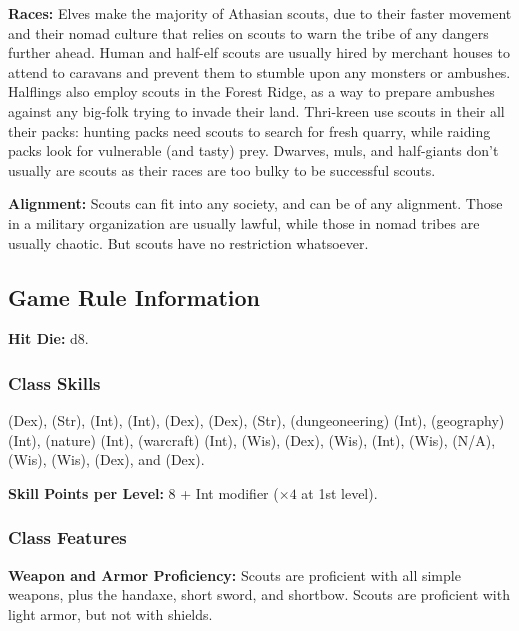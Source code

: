 \textbf{Races:} Elves make the majority of Athasian scouts, due to their faster movement and their nomad culture that relies on scouts to warn the tribe of any dangers further ahead. Human and half-elf scouts are usually hired by merchant houses to attend to caravans and prevent them to stumble upon any monsters or ambushes. Halflings also employ scouts in the Forest Ridge, as a way to prepare ambushes against any big-folk trying to invade their land. Thri-kreen use scouts in their all their packs: hunting packs need scouts to search for fresh quarry, while raiding packs look for vulnerable (and tasty) prey. Dwarves, muls, and half-giants don't usually are scouts as their races are too bulky to be successful scouts.

\textbf{Alignment:} Scouts can fit into any society, and can be of any alignment. Those in a military organization are usually lawful, while those in nomad tribes are usually chaotic. But scouts have no restriction whatsoever.

\subsection{Game Rule Information}
\textbf{Hit Die:} d8.

\subsubsection{Class Skills}
 (Dex),
 (Str),
 (Int),
 (Int),
 (Dex),
 (Dex),
 (Str),
 (dungeoneering) (Int),
 (geography) (Int),
 (nature) (Int),
 (warcraft) (Int),
 (Wis),
 (Dex),
 (Wis),
 (Int),
 (Wis),
 (N/A),
 (Wis),
 (Wis),
 (Dex),
and  (Dex).

\textbf{Skill Points per Level:} 8 + Int modifier ($\times4$ at 1st level).

\subsubsection{Class Features}
\textbf{Weapon and Armor Proficiency:} Scouts are proficient with all simple weapons, plus the handaxe, short sword, and shortbow. Scouts are proficient with light armor, but not with shields.



